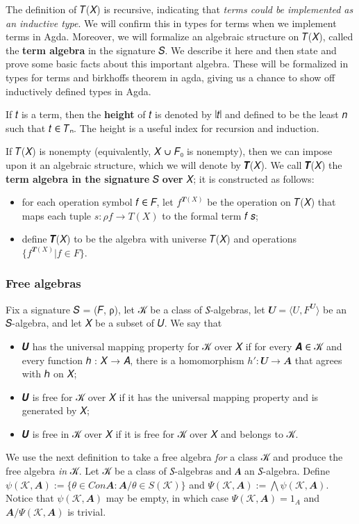 \documentclass[sigplan,screen]{acmart}
\begin{document}
The definition of 𝑇(𝑋) is recursive, indicating that \emph{terms could be implemented as an inductive type}. We will confirm this in types for terms when we implement terms in Agda. Moreover, we will formalize an algebraic structure on 𝑇(𝑋), called the \textbf{term algebra} in the signature 𝑆. We describe it here and then state and prove some basic facts about this important algebra. These will be formalized in types for terms and birkhoffs theorem in agda, giving us a chance to show off inductively defined types in Agda.

If 𝑡 is a term, then the \textbf{height} of 𝑡 is denoted by ∣𝑡∣ and defined to be the least 𝑛 such that 𝑡 ∈ 𝑇ₙ. The height is a useful index for recursion and induction.

If 𝑇(𝑋) is nonempty (equivalently, 𝑋 ∪ 𝐹₀ is nonempty), then we can impose upon it an algebraic structure, which we will denote by 𝑻(𝑋). We call 𝑻(𝑋) the \textbf{term algebra in the signature} 𝑆 \textbf{over} 𝑋; it is constructed as follows:
\begin{itemize}
\item for each operation symbol 𝑓 ∈ 𝐹, let \(f^{𝑻(X)}\) be the operation on 𝑇(𝑋) that maps each tuple \(𝑠 : ρ𝑓 → 𝑇(𝑋)\) to the formal term 𝑓 𝑠;
\item define 𝑻(𝑋) to be the algebra with universe 𝑇(𝑋) and operations \(\{f^{𝑻(X)} | f ∈ F\}\).
\end{itemize}

\subsubsection{Free algebras}\label{free-algebras}
Fix a signature 𝑆 = (𝐹, ρ), let 𝒦 be a class of 𝑆-algebras, let \(𝑼 = ⟨𝑈, 𝐹^𝑼⟩\) be an 𝑆-algebra, and let 𝑋 be a subset of 𝑈. We say that
\begin{itemize}
\item 𝑼 has the universal mapping property for 𝒦 over 𝑋 if for every 𝑨 ∈ 𝒦 and every function ℎ : 𝑋 → 𝐴, there is a homomorphism \(h' : 𝑼 → 𝑨\) that agrees with ℎ on 𝑋;
\item 𝑼 is free for 𝒦 over 𝑋 if it has the universal mapping property and is generated by 𝑋;
\item 𝑼 is free in 𝒦 over 𝑋 if it is free for 𝒦 over 𝑋 and belongs to 𝒦.
\end{itemize}
We use the next definition to take a free algebra \emph{for} a class 𝒦 and produce the free algebra \emph{in} 𝒦. Let 𝒦 be a class of 𝑆-algebras and 𝑨 an 𝑆-algebra. Define \(ψ(𝒦, 𝑨) := \{θ ∈ Con 𝑨 : 𝑨/θ ∈ S(𝒦)\}\) and \(Ψ(𝒦, 𝑨) := ⋀ ψ(𝒦, 𝑨)\). Notice that \(ψ(𝒦, 𝑨)\) may be empty, in which case \(Ψ(𝒦, 𝑨) = 1_A\) and \(𝑨/Ψ(𝒦, 𝑨)\) is trivial.
\end{document}
